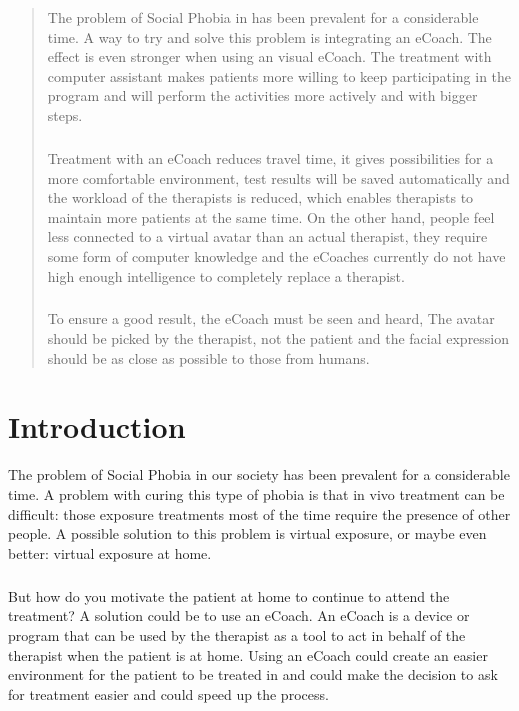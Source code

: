 \documentclass[english,a4paper,pdftex]{report}
\begin{document}

\newpage

\begin{abstract}
The problem of Social Phobia in has been prevalent for a considerable time. A way to try and solve this problem is integrating an eCoach. The effect is even stronger when using an visual eCoach. The treatment with computer assistant makes patients more willing to keep participating in the program and will perform the activities more actively and with bigger steps.
\paragraph{}
 Treatment with an eCoach reduces travel time, it gives possibilities for a more comfortable environment, test results will be saved automatically and the workload of the therapists is reduced, which enables therapists to maintain more patients at the same time.
On the other hand, people feel less connected to a virtual avatar than an actual therapist, they require some form of computer knowledge and the eCoaches currently do not have high enough intelligence to completely replace a therapist.
\paragraph{}
To ensure a good result, the eCoach must be seen and heard, The avatar should be picked by the therapist, not the patient and the facial expression should be as close as possible to those from humans.

\end{abstract}

\tableofcontents

\chapter{Introduction}
The problem of Social Phobia in our society has been prevalent for a considerable time. A problem with curing this type of phobia is that in vivo treatment can be difficult: those exposure treatments most of the time require the presence of other people. A possible solution to this problem is virtual exposure, or maybe even better: virtual exposure at home.
\paragraph{}
But how do you motivate the patient at home to continue to attend the treatment? A solution could be to use an eCoach. An eCoach is a device or program that can be used by the therapist as a tool to act in behalf of the therapist when the patient is at home. Using an eCoach could create an easier environment for the patient to be treated in and could make the decision to ask for treatment easier and could speed up the process.
\end{document}
